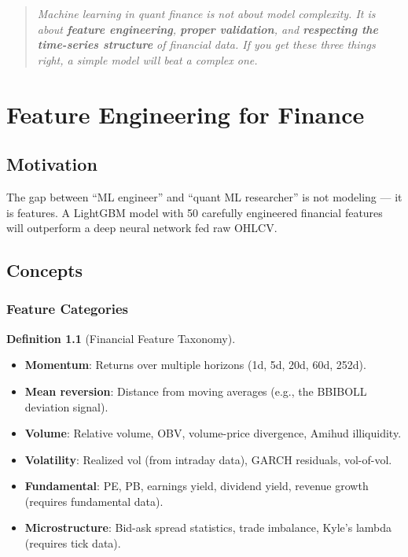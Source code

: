 \documentclass[a4paper, 11pt]{report}
\theoremstyle{definition}
\newtheorem{definition}{Definition}[chapter]
\theoremstyle{remark}
\begin{document}
\begin{quote}
\itshape
Machine learning in quant finance is not about model complexity.  It is about
\textbf{feature engineering}, \textbf{proper validation}, and \textbf{respecting
the time-series structure} of financial data.  If you get these three things
right, a simple model will beat a complex one.
\end{quote}


\chapter{Feature Engineering for Finance}
\label{ch:features}

\section{Motivation}

The gap between ``ML engineer'' and ``quant ML researcher'' is not modeling ---
it is features.  A LightGBM model with 50 carefully engineered financial
features will outperform a deep neural network fed raw OHLCV\@.

\section{Concepts}

\subsection{Feature Categories}

\begin{definition}[Financial Feature Taxonomy]
    \begin{itemize}
        \item \textbf{Momentum}: Returns over multiple horizons
              (1d, 5d, 20d, 60d, 252d).
        \item \textbf{Mean reversion}: Distance from moving averages
              (e.g., the BBIBOLL deviation signal).
        \item \textbf{Volume}: Relative volume, OBV,
              volume-price divergence, Amihud illiquidity.
        \item \textbf{Volatility}: Realized vol (from intraday data), GARCH
              residuals, vol-of-vol.
        \item \textbf{Fundamental}: PE, PB, earnings yield, dividend yield,
              revenue growth (requires fundamental data).
        \item \textbf{Microstructure}: Bid-ask spread statistics, trade
              imbalance, Kyle's lambda (requires tick data).
    \end{itemize}
\end{definition}
\end{document}
